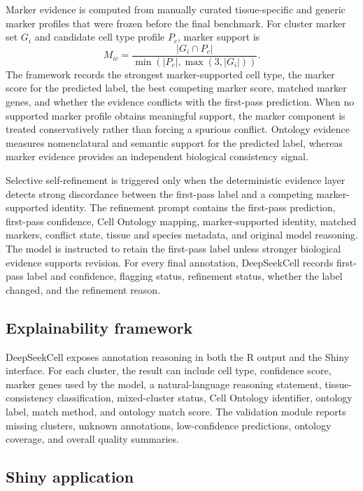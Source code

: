 \documentclass[referee,lineno,pdflatex]{sn-jnl}
\begin{document}
Marker evidence is computed from manually curated tissue-specific and generic marker profiles that were frozen before the final benchmark. For cluster marker set $G_i$ and candidate cell type profile $P_c$, marker support is
\begin{equation}
M_{ic}=\frac{|G_i\cap P_c|}{\min(|P_c|,\max(3,|G_i|))}.
\label{eq:marker-support}
\end{equation}
The framework records the strongest marker-supported cell type, the marker score for the predicted label, the best competing marker score, matched marker genes, and whether the evidence conflicts with the first-pass prediction. When no supported marker profile obtains meaningful support, the marker component is treated conservatively rather than forcing a spurious conflict. Ontology evidence measures nomenclatural and semantic support for the predicted label, whereas marker evidence provides an independent biological consistency signal.

Selective self-refinement is triggered only when the deterministic evidence layer detects strong discordance between the first-pass label and a competing marker-supported identity. The refinement prompt contains the first-pass prediction, first-pass confidence, Cell Ontology mapping, marker-supported identity, matched markers, conflict state, tissue and species metadata, and original model reasoning. The model is instructed to retain the first-pass label unless stronger biological evidence supports revision. For every final annotation, DeepSeekCell records first-pass label and confidence, flagging status, refinement status, whether the label changed, and the refinement reason.

\subsection{Explainability framework}

DeepSeekCell exposes annotation reasoning in both the R output and the Shiny interface. For each cluster, the result can include cell type, confidence score, marker genes used by the model, a natural-language reasoning statement, tissue-consistency classification, mixed-cluster status, Cell Ontology identifier, ontology label, match method, and ontology match score. The validation module reports missing clusters, unknown annotations, low-confidence predictions, ontology coverage, and overall quality summaries.

\subsection{Shiny application}
\end{document}
